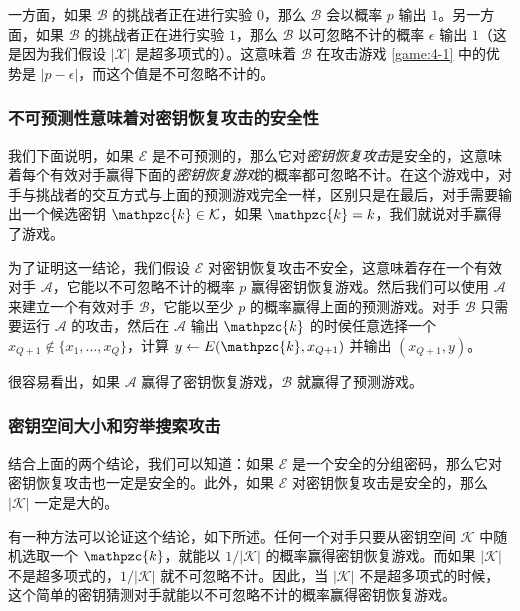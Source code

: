 一方面，如果 $\mathcal{B}$ 的挑战者正在进行实验 $0$，那么 $\mathcal{B}$ 会以概率 $p$ 输出 $1$。另一方面，如果 $\mathcal{B}$ 的挑战者正在进行实验 $1$，那么 $\mathcal{B}$ 以可忽略不计的概率 $\epsilon$ 输出 $1$（这是因为我们假设 $|\mathcal{X}|$ 是超多项式的）。这意味着 $\mathcal{B}$ 在攻击游戏 \ref{game:4-1} 中的优势是 $|p-\epsilon|$，而这个值是不可忽略不计的。

\subsubsection{不可预测性意味着对密钥恢复攻击的安全性}\label{subsubsec:4-1-1-2}

我们下面说明，如果 $\mathcal{E}$ 是不可预测的，那么它对\emph{密钥恢复攻击}是安全的，这意味着每个有效对手赢得下面的\emph{密钥恢复游戏}的概率都可忽略不计。在这个游戏中，对手与挑战者的交互方式与上面的预测游戏完全一样，区别只是在最后，对手需要输出一个候选密钥 $\mathpzc{k}\in\mathcal{K}$，如果 $\mathpzc{k}=k$，我们就说对手赢得了游戏。

为了证明这一结论，我们假设 $\mathcal{E}$ 对密钥恢复攻击不安全，这意味着存在一个有效对手 $\mathcal{A}$，它能以不可忽略不计的概率 $p$ 赢得密钥恢复游戏。然后我们可以使用 $\mathcal{A}$ 来建立一个有效对手 $\mathcal{B}$，它能以至少 $p$ 的概率赢得上面的预测游戏。对手 $\mathcal{B}$ 只需要运行 $\mathcal{A}$ 的攻击，然后在 $\mathcal{A}$ 输出 $\mathpzc{k}$ 的时侯任意选择一个 $x_{Q+1}\notin\{x_1,\dots,x_Q\}$，计算 $y\leftarrow E(\mathpzc{k},x_{Q+1})$ 并输出 $(x_{Q+1},y)$。

很容易看出，如果 $\mathcal{A}$ 赢得了密钥恢复游戏，$\mathcal{B}$ 就赢得了预测游戏。

\subsubsection{密钥空间大小和穷举搜索攻击}

结合上面的两个结论，我们可以知道：如果 $\mathcal{E}$ 是一个安全的分组密码，那么它对密钥恢复攻击也一定是安全的。此外，如果 $\mathcal{E}$ 对密钥恢复攻击是安全的，那么 $|\mathcal{K}|$ 一定是大的。

有一种方法可以论证这个结论，如下所述。任何一个对手只要从密钥空间 $\mathcal{K}$ 中随机选取一个 $\mathpzc{k}$，就能以 ${1}/{|\mathcal{K}|}$ 的概率赢得密钥恢复游戏。而如果 $|\mathcal{K}|$ 不是超多项式的，${1}/{|\mathcal{K}|}$ 就不可忽略不计。因此，当 $|\mathcal{K}|$ 不是超多项式的时候，这个简单的密钥猜测对手就能以不可忽略不计的概率赢得密钥恢复游戏。


